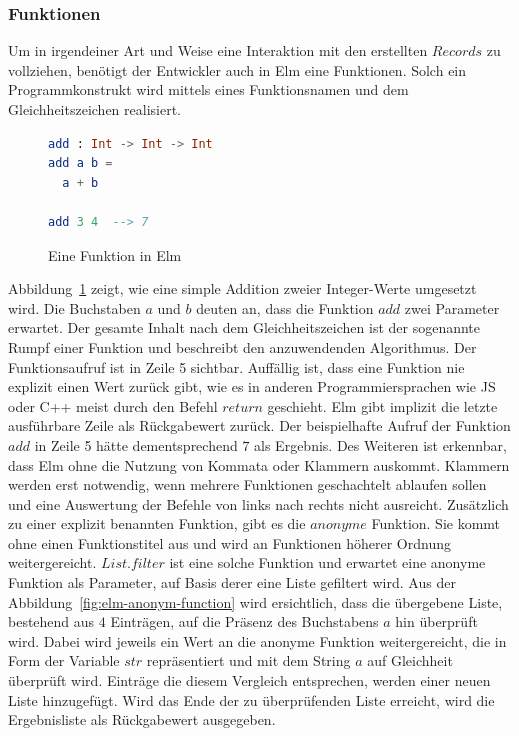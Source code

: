 \subsubsection{Funktionen}
\label{sec:Funktionen}
Um in irgendeiner Art und Weise eine Interaktion mit den erstellten $Records$ zu vollziehen, benötigt der Entwickler auch in Elm eine Funktionen. Solch ein Programmkonstrukt wird mittels eines Funktionsnamen und dem Gleichheitszeichen realisiert.
\begin{figure}[h]
\begin{lstlisting}[language=Elm]
add : Int -> Int -> Int
add a b =
  a + b

add 3 4  --> 7
\end{lstlisting}
\caption{Eine Funktion in Elm}\label{fig:elm-function}
\end{figure}
Abbildung~\ref{fig:elm-function} zeigt, wie eine simple Addition zweier Integer-Werte umgesetzt wird. Die Buchstaben $a$ und $b$ deuten an, dass die Funktion $add$ zwei Parameter erwartet. Der gesamte Inhalt nach dem Gleichheitszeichen ist der sogenannte Rumpf einer Funktion und beschreibt den anzuwendenden Algorithmus. Der Funktionsaufruf ist in Zeile 5 sichtbar. Auffällig ist, dass eine Funktion nie explizit einen Wert zurück gibt, wie es in anderen Programmiersprachen wie \ac{JS} oder C++ meist durch den Befehl $return$ geschieht. Elm gibt implizit die letzte ausführbare Zeile als Rückgabewert zurück. Der beispielhafte Aufruf der Funktion $add$ in Zeile 5 hätte dementsprechend $7$ als Ergebnis. Des Weiteren ist erkennbar, dass Elm ohne die Nutzung von Kommata oder Klammern auskommt. Klammern werden erst notwendig, wenn mehrere Funktionen geschachtelt ablaufen sollen und eine Auswertung der Befehle von links nach rechts nicht ausreicht.
Zusätzlich zu einer explizit benannten Funktion, gibt es die $anonyme$ Funktion. Sie kommt ohne einen Funktionstitel aus und wird an Funktionen höherer Ordnung weitergereicht.
$List.filter$ ist eine solche Funktion und erwartet eine anonyme Funktion als Parameter, auf Basis derer eine Liste gefiltert wird. Aus der Abbildung~\ref{fig:elm-anonym-function} wird ersichtlich, dass die übergebene Liste, bestehend aus $4$ Einträgen, auf die Präsenz des Buchstabens $a$ hin überprüft wird. Dabei wird jeweils ein Wert an die anonyme Funktion weitergereicht, die in Form der Variable $str$ repräsentiert und mit dem String $a$ auf Gleichheit überprüft wird. Einträge die diesem Vergleich entsprechen, werden einer neuen Liste hinzugefügt. Wird das Ende der zu überprüfenden Liste erreicht, wird die Ergebnisliste als Rückgabewert ausgegeben.

